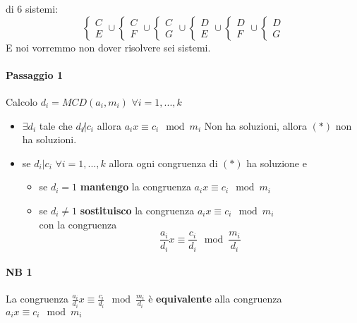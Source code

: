di 6 sistemi:
$$
\begin{cases}
    C\\E
\end{cases}\cup
\begin{cases}
    C\\F
\end{cases}\cup
\begin{cases}
    C\\G
\end{cases}\cup
\begin{cases}
    D\\E
\end{cases}\cup
\begin{cases}
    D\\F
\end{cases}\cup
\begin{cases}
    D\\G
\end{cases}
$$
E noi vorremmo non dover risolvere sei sistemi.
\paragraph{Passaggio 1} Calcolo $d_i=MCD(a_i,m_i)$ $\forall i=1,...,k$
%
%
\begin{itemize}
    \item $\exists d_i$ tale che $d_i\not| c_i$ allora $a_ix\equiv c_i \mod m_i$ Non ha soluzioni, allora $(*)$ non ha soluzioni.
    \item se $d_i|c_i$ $\forall i=1,...,k$ allora ogni congruenza di $(*)$ ha soluzione e 
        \begin{itemize}
            \item se $d_i=1$ \textbf{mantengo} la congruenza $a_ix\equiv c_i \mod m_i$
            \item se $d_i\neq1$ \textbf{sostituisco} la congruenza $a_ix\equiv c_i \mod m_i$\\
                con la congruenza
                $$\frac{a_i}{d_i}x\equiv\frac{c_i}{d_i}\mod\frac{m_i}{d_i}$$
        \end{itemize}
\end{itemize}
\paragraph{NB 1} La congruenza $\frac{a_i}{d_i}x\equiv\frac{c_i}{d_i}\mod\frac{m_i}{d_i}$ è \textbf{equivalente} alla congruenza $a_ix\equiv c_i \mod m_i$
